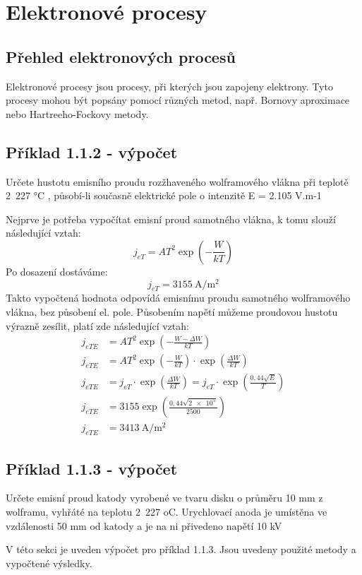 \section{Elektronové procesy}

\subsection{Přehled elektronových procesů}

Elektronové procesy jsou procesy, při kterých jsou zapojeny elektrony. Tyto procesy mohou být popsány pomocí různých metod, např. Bornovy aproximace nebo Hartreeho-Fockovy metody.

\subsection{Příklad 1.1.2 - výpočet}
\begin{zadani}
    Určete hustotu emisního proudu rozžhaveného wolframového vlákna 
    při teplotě 2 227 °C , působí-li současně elektrické pole o intenzitě 
    E = 2.105 V.m-1
\end{zadani}

Nejprve je potřeba vypočítat emisní proud samotného vlákna, k tomu slouží následující vztah:
\[
    j_{eT} = A T^2 \exp\left(-\frac{W}{kT}\right)
\]
Po dosazení dostáváme:
\[
    j_{eT} =\qty{3155}{\ampere\per\square\meter}
\]
Takto vypočtená hodnota odpovídá emisnímu proudu samotného wolframového vlákna, bez působení el. pole. Působením napětí můžeme proudovou hustotu výrazně zesílit, platí zde následující vztah:
\begin{align*}
    j_{eTE} &= A T^2 \exp\left(-\frac{W-\Delta W}{kT}\right) \\
    j_{eTE} &= A T^2 \exp\left(-\frac{W}{kT}\right) \cdot \exp\left(\frac{\Delta W}{kT}\right) \\
    j_{eTE} &= j_{eT} \cdot \exp\left(\frac{\Delta W}{kT}\right)= j_{eT} \cdot \exp\left(\frac{0,44\sqrt{E} }{T}\right)\\
    j_{eTE} &= \num{3155}\exp\left(\frac{0,44\sqrt{\num{2e5}} }{\num{2500}}\right) \\
    j_{eTE} &= \qty{3413}{\ampere\per\square\meter }
\end{align*}



\subsection{Příklad 1.1.3 - výpočet}
\begin{zadani}
    Určete emisní proud katody vyrobené ve tvaru disku o průměru 10 mm
    z wolframu, vyhřáté na teplotu 2 227 oC. Urychlovací anoda je umístěna 
    ve vzdálenosti  50 mm  od katody a je na ni přivedeno napětí  10 kV
\end{zadani}

V této sekci je uveden výpočet pro příklad 1.1.3. Jsou uvedeny použité metody a vypočtené výsledky.